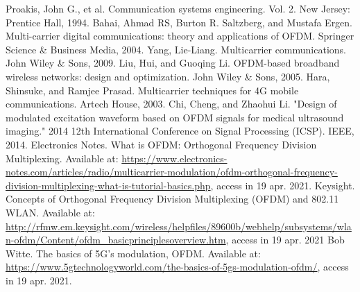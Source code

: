 \begin{thebibliography}{99}
 Proakis, John G., et al. Communication systems engineering. Vol. 2. New Jersey: Prentice Hall, 1994.
 Bahai, Ahmad RS, Burton R. Saltzberg, and Mustafa Ergen. Multi-carrier digital communications: theory and applications of OFDM. Springer Science \& Business Media, 2004.
 Yang, Lie-Liang. Multicarrier communications. John Wiley \& Sons, 2009.
 Liu, Hui, and Guoqing Li. OFDM-based broadband wireless networks: design and optimization. John Wiley \& Sons, 2005.
 Hara, Shinsuke, and Ramjee Prasad. Multicarrier techniques for 4G mobile communications. Artech House, 2003.
 Chi, Cheng, and Zhaohui Li. "Design of modulated excitation waveform based on OFDM signals for medical ultrasound imaging." 2014 12th International Conference on Signal Processing (ICSP). IEEE, 2014.
 Electronics Notes. What is OFDM: Orthogonal Frequency Division Multiplexing. Available at: \url{https://www.electronics-notes.com/articles/radio/multicarrier-modulation/ofdm-orthogonal-frequency-division-multiplexing-what-is-tutorial-basics.php}, access in 19 apr. 2021.
 Keysight. Concepts of Orthogonal Frequency Division Multiplexing (OFDM) and 802.11 WLAN. Available at: \url{http://rfmw.em.keysight.com/wireless/helpfiles/89600b/webhelp/subsystems/wlan-ofdm/Content/ofdm\_basicprinciplesoverview.htm}, access in 19 apr. 2021
 Bob Witte. The basics of 5G’s modulation, OFDM. Available at: \url{https://www.5gtechnologyworld.com/the-basics-of-5gs-modulation-ofdm/}, access in 19 apr. 2021.



\end{thebibliography}